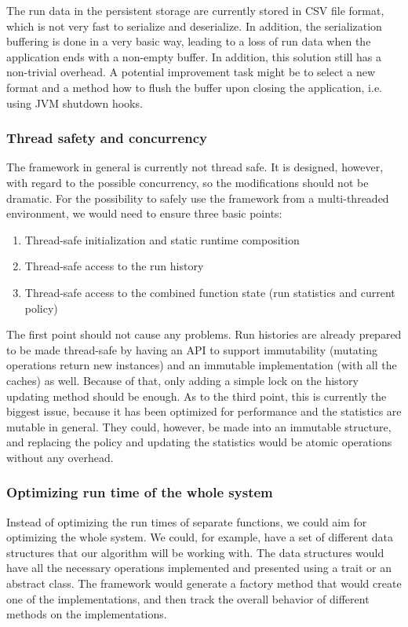 The run data in the persistent storage are currently stored in CSV file format, which is not very fast to serialize and deserialize. In addition, the serialization buffering is done in a very basic way, leading to a loss of run data when the application ends with a non-empty buffer. In addition, this solution still has a non-trivial overhead. A potential improvement task might be to select a new format and a method how to flush the buffer upon closing the application, i.e. using JVM shutdown hooks.

\subsubsection{Thread safety and concurrency}

The framework in general is currently not thread safe. It is designed, however, with regard to the possible concurrency, so the modifications should not be dramatic. For the possibility to safely use the framework from a multi-threaded environment, we would need to ensure three basic points:

\begin{enumerate}
	\item Thread-safe initialization and static runtime composition
	\item Thread-safe access to the run history
	\item Thread-safe access to the combined function state (run statistics and current policy)
\end{enumerate}

The first point should not cause any problems. Run histories are already prepared to be made thread-safe by having an API to support immutability (mutating operations return new instances) and an immutable implementation (with all the caches) as well. Because of that, only adding a simple lock on the history updating method should be enough. As to the third point, this is currently the biggest issue, because it has been optimized for performance and the statistics are mutable in general. They could, however, be made into an immutable structure, and replacing the policy and updating the statistics would be atomic operations without any overhead.

\subsubsection{Optimizing run time of the whole system}

Instead of optimizing the run times of separate functions, we could aim for optimizing the whole system. We could, for example, have a set of different data structures that our algorithm will be working with. The data structures would have all the necessary operations implemented and presented using a trait or an abstract class. The framework would generate a factory method that would create one of the implementations, and then track the overall behavior of different methods on the implementations. 


